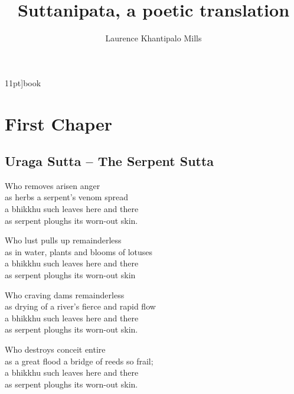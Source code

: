11pt]{book}
\usepackage{enumitem,graphicx,charter,multicol}
\pagestyle{myheadings}
\newcommand*{\MyLabel}{}%
\newenvironment{MyDescription}[2][]{%
    \edef\MyLabel{#1}%
    \begin{description}[labelwidth=3.0cm, leftmargin=3.0cm, labelsep=0.0ex, font=\normalfont]
    \item [#2]
}{%
    \hfill\MyLabel%
    \end{description}%
}


\part{First Chaper}
\title{Suttanipata, a poetic translation}
\author{Laurence Khantipalo Mills}
\chapter{Uraga Sutta -- The Serpent Sutta}
\begin{MyDescription}[\arabic{stanza}]{}
   Who removes arisen anger \\
   as herbs a serpent's venom spread \\
   a bhikkhu such leaves here and there \\
   as serpent ploughs its worn-out skin.
   \end{MyDescription}
   
   \begin{MyDescription}[]{}
   Who lust pulls up remainderless \\
   as in water, plants and blooms of lotuses\\
   a bhikkhu such leaves here and there\\
   as serpent ploughs its worn-out skin				
   \end{MyDescription}   
   
\begin{MyDescription}[]{}
   Who craving dams remainderless\\
   as drying of a river's fierce and rapid flow\\
   a bhikkhu such leaves here and there\\
   as serpent ploughs its worn-out skin.
   \end{MyDescription}
   
   \begin{MyDescription}[]{}
   Who destroys conceit entire\\
   as a great flood a bridge of reeds so frail;\\
   a bhikkhu such leaves here and there\\
   as serpent ploughs its worn-out skin.
   \end{MyDescription}
   
